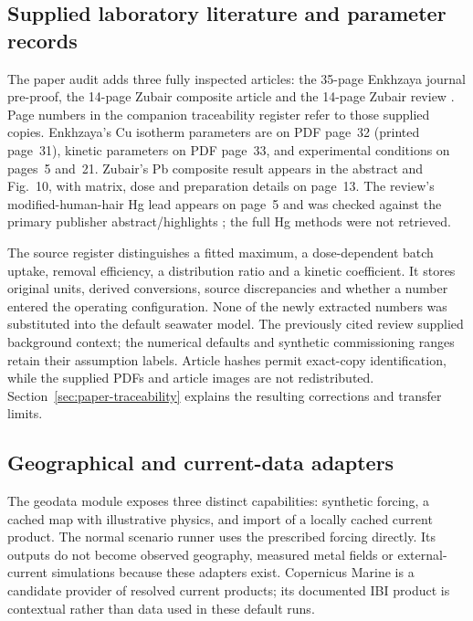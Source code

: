 \subsection{Supplied laboratory literature and parameter records}

The paper audit adds three fully inspected articles: the 35-page Enkhzaya journal pre-proof, the 14-page Zubair composite article and the 14-page Zubair review \citep{enkhzaya2020,zubair2025,zubair2026}. Page numbers in the companion traceability register refer to those supplied copies. Enkhzaya's Cu isotherm parameters are on PDF page~32 (printed page~31), kinetic parameters on PDF page~33, and experimental conditions on pages~5 and~21. Zubair's Pb composite result appears in the abstract and Fig.~10, with matrix, dose and preparation details on page~13. The review's modified-human-hair Hg lead appears on page~5 and was checked against the primary publisher abstract/highlights \citep{liang2023}; the full Hg methods were not retrieved.

The source register distinguishes a fitted maximum, a dose-dependent batch uptake, removal efficiency, a distribution ratio and a kinetic coefficient. It stores original units, derived conversions, source discrepancies and whether a number entered the operating configuration. None of the newly extracted numbers was substituted into the default seawater model. The previously cited review supplied background context; the numerical defaults and synthetic commissioning ranges retain their assumption labels. Article hashes permit exact-copy identification, while the supplied PDFs and article images are not redistributed. Section~\ref{sec:paper-traceability} explains the resulting corrections and transfer limits.

\subsection{Geographical and current-data adapters}

The geodata module exposes three distinct capabilities: synthetic forcing, a cached map with illustrative physics, and import of a locally cached current product. The normal scenario runner uses the prescribed forcing directly. Its outputs do not become observed geography, measured metal fields or external-current simulations because these adapters exist. Copernicus Marine is a candidate provider of resolved current products; its documented IBI product is contextual rather than data used in these default runs.\cite{copernicusIbi}

